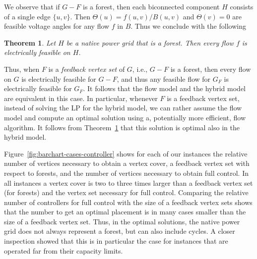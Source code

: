 \documentclass{article}[11pt,a4paper]
\newtheorem{theorem}{Theorem}[section]
\begin{document}
We observe that if $G-F$ is a forest, then each biconnected component
$H$ consists of a single edge $\{u,v\}$.  Then $\Theta(u) = f(u,v) /
B(u,v)$ and $\Theta(v) = 0$ are feasible voltage angles for any flow $f$
in $B$. Thus we conclude with the following
\begin{theorem}
  \label{thm:fvs}
  Let $H$ be a native power grid that is a forest.  Then every flow
  $f$ is electrically feasible on $H$.
\end{theorem}
Thus, when $F$ is a \emph{feedback vertex set} of $G$, i.e., $G-F$ is
a forest, then every flow on $G$ is electrically feasible for $G-F$,
and thus any feasible flow for $G_F$ is electrically feasible for
$G_F$.  It follows that the flow model and the hybrid model are
equivalent in this case.  In particular, whenever $F$ is a feedback
vertex set, instead of solving the LP for the hybrid model, we can
rather assume the flow model and compute an optimal solution using a,
potentially more efficient, flow algorithm.  It follows from
Theorem~\ref{thm:fvs} that this solution is optimal also in the hybrid
model.

Figure~\ref{fig:barchart-cases-controller} shows for each of our
instances the relative number of vertices necessary to obtain a vertex
cover, a feedback vertex set with respect to forests, and the number
of vertices necessary to obtain full control.  In all instances a
vertex cover is two to three times larger than a feedback vertex set
(for forests) and the vertex set necessary for full control.
Comparing the relative number of controllers for full control with the
size of a feedback vertex sets shows that the number to get an optimal
placement is in many cases smaller than the size of a feedback vertex
set.  Thus, in the optimal solutions, the native power grid does not
always represent a forest, but can also include cycles.  A closer
inspection showed that this is in particular the case for instances
that are operated far from their capacity limits.
\end{document}
